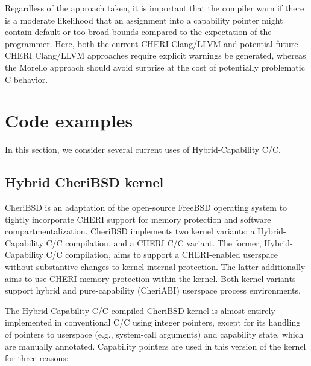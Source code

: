 \documentclass[12pt,twoside,openright,a4paper]{article}
\newcommand{\note}[2]{{\color{blue}[ Note: #1 - #2]}}
\renewcommand{\note}[2]{\relax\ifhmode\unskip\fi}
\newcommand{\psnote}[1]{\note{#1}{Peter S.}}
\newcommand{\dcnote}[1]{\note{#1}{David}}
\newcommand*{\cpp}{\texorpdfstring{C\textsmaller[2]{\protect\nolinebreak[4]\hspace{-.05em}\raisebox{.45ex}{\textbf{++}}}}{C++}}
\newcommand*{\COrCpp}{C/\cpp{}}
\newcommand*{\purecapCOrCpp}{CHERI \COrCpp{}}
\newcommand*{\hybridCOrCpp}{Hybrid-Capability \COrCpp{}}
\begin{document}
Regardless of the approach taken, it is important that the compiler warn if
there is a moderate likelihood that an assignment into a capability pointer
might contain default or too-broad bounds compared to the expectation of the
programmer.
Here, both the current CHERI Clang/LLVM and potential future CHERI Clang/LLVM
approaches require explicit warnings be generated, whereas the Morello
approach should avoid surprise at the cost of potentially problematic C
behavior.
\psnote{That last sentence is structured as an opposition -- but warnings and avoiding surprise seem consonant...}

\dcnote{This section is missing any description of C++ references.  I recall
that there were some fun corner cases here, for example if you have a
cap-pointer to an object (which may not be in DDC), what is the type of a
reference to that reference?}

\section{Code examples}
\label{section:hybrid-c-examples}

In this section, we consider several current uses of \hybridCOrCpp{}.

\subsection{Hybrid CheriBSD kernel}

CheriBSD is an adaptation of the open-source FreeBSD operating system to
tightly incorporate CHERI support for memory protection and software
compartmentalization.
CheriBSD implements two kernel variants: a \hybridCOrCpp{} compilation, and a
\purecapCOrCpp{} variant.
The former, \hybridCOrCpp{} compilation, aims to support a CHERI-enabled userspace
without substantive changes to kernel-internal protection.
The latter additionally aims to use CHERI memory protection within the
kernel.
\psnote{say explicitly that we don't discuss the latter further here?  Otherwise it's confusing to set up the opposition but then only talk about the former below}
Both kernel variants support hybrid and pure-capability (CheriABI) userspace
process environments.

The \hybridCOrCpp{}-compiled CheriBSD kernel is almost entirely implemented
in conventional \COrCpp{} using integer pointers, except for its handling of
pointers to userspace (e.g., system-call arguments) and capability state,
which are manually annotated.
Capability pointers are used in this version of the kernel for three reasons:
\end{document}

